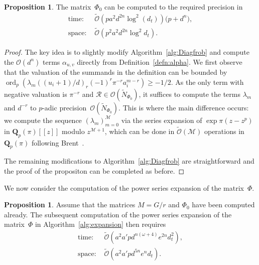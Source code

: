 \documentclass[a4paper,11pt]{article}
\numberwithin{equation}{section}
\newcommand{\QQ}{\mathbf{Q}} %
\DeclareMathOperator{\ord}{ord}          %
\providecommand{\BigOh}{\mathcal{O}}          %
\providecommand{\SoftOh}{\tilde{\mathcal{O}}} %
\theoremstyle{definition}
\newtheorem{prop}[thm]{Proposition}
\begin{document}
\begin{prop}
The matrix~$\Phi_0$ can be computed to the required precision in 
\begin{align*}
\mbox{time: }  &\SoftOh(p a^2 d^{2n} \log^2(d_t)) \bigl( p + d^n \bigr), \\
\mbox{space: } &\SoftOh(p^2 a^2 d^{2n} \log^2 d_t).
\end{align*}
\end{prop}

\begin{proof}
The key idea is to slightly modify Algorithm~\ref{alg:Diagfrob} 
and compute the $\BigOh(d^n)$ terms $\alpha_{u,v}$ directly from 
Definition~\ref{defn:alpha}.  We first observe that the valuation 
of the summands in the definition can be bounded by 
$\ord_p(\lambda_m ((u_i+1)/d)_r (-1)^r \pi^{-r} a_i^{m-r}) \geq -1/2$. 
As the only term with negative valuation is $\pi^{-r}$ and 
$\mathcal{R} \in \BigOh(\tilde{N}_{\Phi_0})$, it suffices 
to compute the terms $\lambda_m$ and $d^{-r}$ to $p$-adic 
precision~$\BigOh(\tilde{N}_{\Phi_0})$.  This is where the main 
difference occurs:  we compute the sequence 
$(\lambda_m)_{m=0}^{\mathcal{M}}$ via the series expansion of 
$\exp \pi (z - z^p)$ in $\QQ_p(\pi)[[z]]$ modulo $z^{\mathcal{M}+1}$, 
which can be done in $\SoftOh(\mathcal{M})$ operations in $\QQ_p(\pi)$ 
following Brent~\citep{Brent1976}.

The remaining modifications to Algorithm~\ref{alg:Diagfrob} are 
straightforward and the proof of the propositon can be completed 
as before.
\end{proof}

We now consider the computation of the power series expansion of the 
matrix~$\Phi$.

\begin{prop}
Assume that the matrices $M = G/r$ and $\Phi_0$ have been computed already.
The subsequent computation of the power series expansion of the matrix~$\Phi$ 
in Algorithm~\ref{alg:expansion} then requires
\begin{align*}
\mbox{time: }  &\SoftOh(a^2 a' p d^{n(\omega+4)}e^{2n} d_t^2), \\
\mbox{space: } &\SoftOh(a^2 a' p d^{5n} e^n d_t).
\end{align*}
\end{prop}
\end{document}
